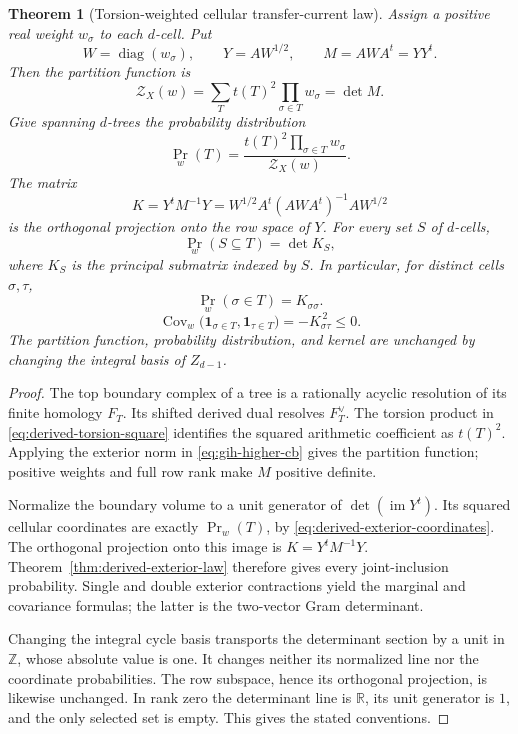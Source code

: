 \documentclass[11pt]{article}
\newtheorem{theorem}{Theorem}[section]
\theoremstyle{definition}
\theoremstyle{remark}
\newcommand{\Z}{\mathbb Z}
\newcommand{\R}{\mathbb R}
\begin{document}
\begin{theorem}[Torsion-weighted cellular transfer-current law]
\label{hte-general-theorem}
Assign a positive real weight $w_\sigma$ to each $d$-cell. Put
\[
W=\operatorname{diag}(w_\sigma),\qquad
Y=AW^{1/2},\qquad M=AWA^t=YY^t.
\]
Then the partition function is
\begin{equation}
\label{hte-partition}
\mathcal Z_X(w)
=\sum_{T}t(T)^2\prod_{\sigma\in T}w_\sigma
=\det M.
\end{equation}
Give spanning $d$-trees the probability distribution
\[
\Pr_w(T)=\frac{t(T)^2\prod_{\sigma\in T}w_\sigma}{\mathcal Z_X(w)}.
\]
The matrix
\begin{equation}
\label{hte-kernel}
K=Y^tM^{-1}Y
=W^{1/2}A^t(AWA^t)^{-1}AW^{1/2}
\end{equation}
is the orthogonal projection onto the row space of $Y$. For every set $S$
of $d$-cells,
\begin{equation}
\label{hte-joint-law}
\Pr_w(S\subseteq T)=\det K_S,
\end{equation}
where $K_S$ is the principal submatrix indexed by $S$. In particular, for
distinct cells $\sigma,\tau$,
\begin{equation}\label{hte-marginal}
\Pr_w(\sigma\in T)=K_{\sigma\sigma}.
\end{equation}
\begin{equation}\label{hte-covariance}
\operatorname{Cov}_w\bigl(\mathbf1_{\sigma\in T},\mathbf1_{\tau\in T}\bigr)
=-K_{\sigma\tau}^{\,2}\leq0.
\end{equation}
The partition function, probability distribution, and kernel are unchanged
by changing the integral basis of $Z_{d-1}$.
\end{theorem}

\begin{proof}
The top boundary complex of a tree is a rationally acyclic resolution of its finite homology $F_T$. Its shifted derived dual resolves $F_T^\vee$. The torsion product in \eqref{eq:derived-torsion-square} identifies the squared arithmetic coefficient as $t(T)^2$. Applying the exterior norm in \eqref{eq:gih-higher-cb} gives the partition function; positive weights and full row rank make $M$ positive definite.

Normalize the boundary volume to a unit generator of $\det(\operatorname{im}Y^t)$. Its squared cellular coordinates are exactly $\Pr_w(T)$, by \eqref{eq:derived-exterior-coordinates}. The orthogonal projection onto this image is $K=Y^tM^{-1}Y$. Theorem~\ref{thm:derived-exterior-law} therefore gives every joint-inclusion probability. Single and double exterior contractions yield the marginal and covariance formulas; the latter is the two-vector Gram determinant.

Changing the integral cycle basis transports the determinant section by a unit in $\Z$, whose absolute value is one. It changes neither its normalized line nor the coordinate probabilities. The row subspace, hence its orthogonal projection, is likewise unchanged. In rank zero the determinant line is $\R$, its unit generator is $1$, and the only selected set is empty. This gives the stated conventions.
\end{proof}
\end{document}
